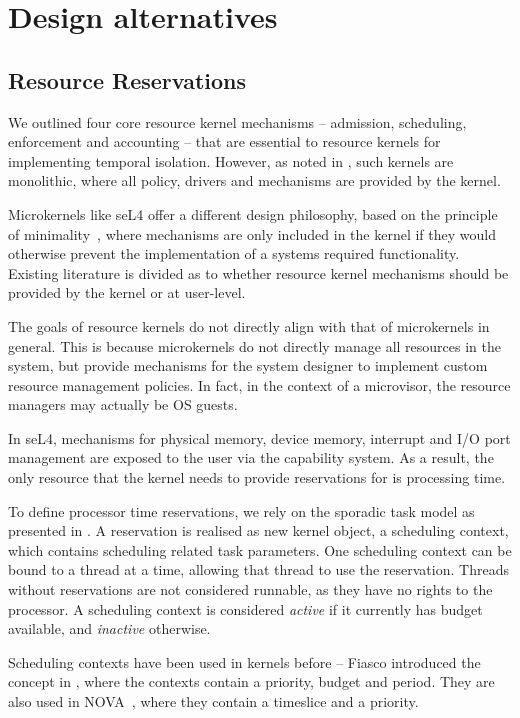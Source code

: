 \section{Design alternatives}

\subsection{Resource Reservations}
\label{sec:model-resource-reservations}

We outlined four core resource kernel mechanisms -- admission, scheduling, enforcement and accounting -- that are essential to resource kernels for implementing temporal isolation.
However, as noted in , such kernels are monolithic, where all policy, drivers and mechanisms are provided by the kernel.

Microkernels like seL4 offer a different design philosophy, based on the principle of minimality~\citep{Liedtke_95}, where mechanisms are only included in the kernel if they would otherwise prevent the implementation of a systems required functionality.
Existing literature is divided as to whether resource kernel mechanisms should be provided by the kernel or at user-level.

The goals of resource kernels do not directly align with that of microkernels in general.
This is because microkernels do not directly manage all resources in the system, but provide mechanisms for the system designer to implement custom resource management policies.
In fact, in the context of a microvisor, the resource managers may actually be OS guests.

In seL4, mechanisms for physical memory, device memory, interrupt and I/O port management are exposed to the user via the capability system.
As a result, the only resource that the kernel needs to provide reservations for is processing time.

To define processor time reservations, we rely on the sporadic task model as presented in .
A reservation is realised as new kernel object, a scheduling context, which contains scheduling related task parameters.
One scheduling context can be bound to a thread at a time, allowing that thread to use the reservation.
Threads without reservations are not considered runnable, as they have no rights to the processor.
A scheduling context is considered \emph{active} if it currently has budget available, and \emph{inactive} otherwise.

Scheduling contexts have been used in kernels before -- Fiasco introduced the concept in \citet{Steinberg_WH_05}, where the contexts contain a priority, budget and period.
They are also used in NOVA~\citep{Steinburg_Kauer_10}, where they contain a timeslice and a priority.

